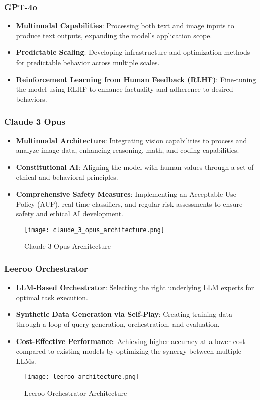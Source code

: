 \documentclass[journal]{IEEEtran}
\begin{document}
\subsubsection{GPT-4o}
\begin{itemize}
    \item \textbf{Multimodal Capabilities}: Processing both text and image inputs to produce text outputs, expanding the model's application scope.
    \item \textbf{Predictable Scaling}: Developing infrastructure and optimization methods for predictable behavior across multiple scales.
    \item \textbf{Reinforcement Learning from Human Feedback (RLHF)}: Fine-tuning the model using RLHF to enhance factuality and adherence to desired behaviors.
\end{itemize}

\subsubsection{Claude 3 Opus}
\begin{itemize}
    \item \textbf{Multimodal Architecture}: Integrating vision capabilities to process and analyze image data, enhancing reasoning, math, and coding capabilities.
    \item \textbf{Constitutional AI}: Aligning the model with human values through a set of ethical and behavioral principles.
    \item \textbf{Comprehensive Safety Measures}: Implementing an Acceptable Use Policy (AUP), real-time classifiers, and regular risk assessments to ensure safety and ethical AI development.
\end{itemize}
\begin{figure}[htbp]
\centerline{\texttt{[image: claude\_3\_opus\_architecture.png]}}
\caption{Claude 3 Opus Architecture}
\label{fig:claude_3_opus}
\end{figure}

\subsubsection{Leeroo Orchestrator}
\begin{itemize}
    \item \textbf{LLM-Based Orchestrator}: Selecting the right underlying LLM experts for optimal task execution.
    \item \textbf{Synthetic Data Generation via Self-Play}: Creating training data through a loop of query generation, orchestration, and evaluation.
    \item \textbf{Cost-Effective Performance}: Achieving higher accuracy at a lower cost compared to existing models by optimizing the synergy between multiple LLMs.
\end{itemize}
\begin{figure}[htbp]
\centerline{\texttt{[image: leeroo\_architecture.png]}}
\caption{Leeroo Orchestrator Architecture}
\label{fig:leeroo}
\end{figure}
\end{document}
